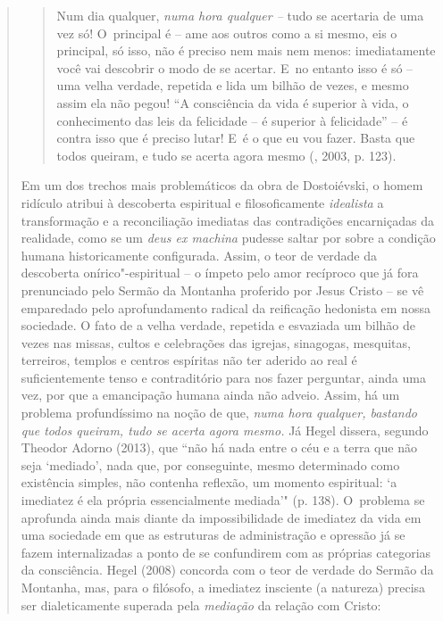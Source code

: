 {\begin{quote}
\begin{quote}
Num dia qualquer, \emph{numa hora qualquer --} tudo se acertaria de uma
vez só! O~principal é -- ame aos outros como a si mesmo, eis o
principal, só isso, não é preciso nem mais nem menos: imediatamente você
vai descobrir o modo de se acertar. E~no entanto isso é só -- uma velha
verdade, repetida e lida um bilhão de vezes, e mesmo assim ela não
pegou! ``A consciência da vida é superior à vida, o conhecimento das
leis da felicidade -- é superior à felicidade'' -- é contra isso que é
preciso lutar! E~é o que eu vou fazer. Basta que todos queiram, e tudo
se acerta agora mesmo (, 2003, p. 123).
\end{quote}

Em um dos trechos mais problemáticos da obra de Dostoiévski, o homem
ridículo atribui à descoberta espiritual e filosoficamente
\emph{idealista} a transformação e a reconciliação imediatas das
contradições encarniçadas da realidade, como se um \emph{deus ex
machina} pudesse saltar por sobre a condição humana historicamente
configurada. Assim, o teor de verdade da descoberta onírico"-espiritual
-- o ímpeto pelo amor recíproco que já fora prenunciado pelo Sermão da
Montanha proferido por Jesus Cristo -- se vê emparedado pelo
aprofundamento radical da reificação hedonista em nossa sociedade. O
fato de a velha verdade, repetida e esvaziada um bilhão de vezes nas
missas, cultos e celebrações das igrejas, sinagogas, mesquitas,
terreiros, templos e centros espíritas não ter aderido ao real é
suficientemente tenso e contraditório para nos fazer perguntar, ainda
uma vez, por que a emancipação humana ainda não adveio. Assim, há um
problema profundíssimo na noção de que, \emph{numa hora qualquer,
bastando que todos queiram, tudo se acerta agora mesmo.} Já Hegel
dissera, segundo Theodor Adorno (2013), que ``não há nada entre o céu e
a terra que não seja `mediado', nada que, por conseguinte, mesmo
determinado como existência simples, não contenha reflexão, um momento
espiritual: `a imediatez é ela própria essencialmente mediada'" (p.
138). O~problema se aprofunda ainda mais diante da impossibilidade de
imediatez da vida em uma sociedade em que as estruturas de administração
e opressão já se fazem internalizadas a ponto de se confundirem com as
próprias categorias da consciência. Hegel (2008) concorda com o teor de
verdade do Sermão da Montanha, mas, para o filósofo, a imediatez
insciente (a natureza) precisa ser dialeticamente superada pela
\emph{mediação} da relação com Cristo:


\end{quote}}
